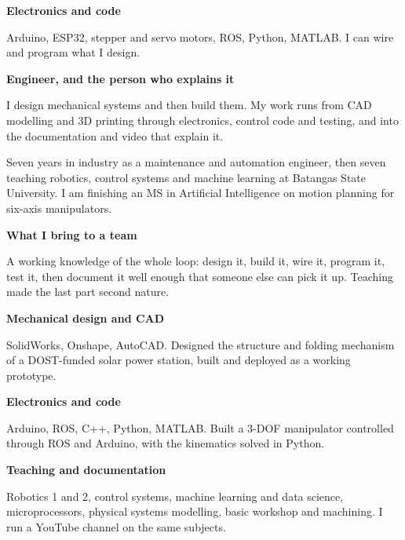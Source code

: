 \documentclass[11pt]{article}
\begin{document}
\begin{minipage}[t]{0.57\linewidth}
  \vspace{4mm}
  {\sffamily\bfseries\small\color{deep}Electronics and code\par}
  \vspace{1.5mm}
  Arduino, ESP32, stepper and servo motors, ROS, Python, MATLAB. I can wire and program
  what I design.

  \vspace{4mm}
\else
  {\sffamily\bfseries\fontsize{18}{22}\selectfont\color{deep}
   Engineer, and the person who explains it\par}
  \vspace{4mm}

  I design mechanical systems and then build them. My work runs from CAD modelling and
  3D printing through electronics, control code and testing, and into the documentation
  and video that explain it.

  \vspace{2.5mm}
  Seven years in industry as a maintenance and automation engineer, then seven teaching
  robotics, control systems and machine learning at Batangas State University. I am
  finishing an MS in Artificial Intelligence on motion planning for six-axis manipulators.

  \vspace{5mm}
  {\sffamily\bfseries\small\color{deep}What I bring to a team\par}
  \vspace{1.5mm}
  A working knowledge of the whole loop: design it, build it, wire it, program it,
  test it, then document it well enough that someone else can pick it up. Teaching made
  the last part second nature.

  \vspace{4mm}
  {\sffamily\bfseries\small\color{deep}Mechanical design and CAD\par}
  \vspace{1.5mm}
  SolidWorks, Onshape, AutoCAD. Designed the structure and folding mechanism of a
  DOST-funded solar power station, built and deployed as a working prototype.

  \vspace{4mm}
  {\sffamily\bfseries\small\color{deep}Electronics and code\par}
  \vspace{1.5mm}
  Arduino, ROS, C++, Python, MATLAB. Built a 3-DOF manipulator controlled through ROS
  and Arduino, with the kinematics solved in Python.

  \vspace{4mm}
  {\sffamily\bfseries\small\color{deep}Teaching and documentation\par}
  \vspace{1.5mm}
  Robotics 1 and 2, control systems, machine learning and data science, microprocessors,
  physical systems modelling, basic workshop and machining. I run a YouTube channel on
  the same subjects.


\end{minipage}
\end{document}
